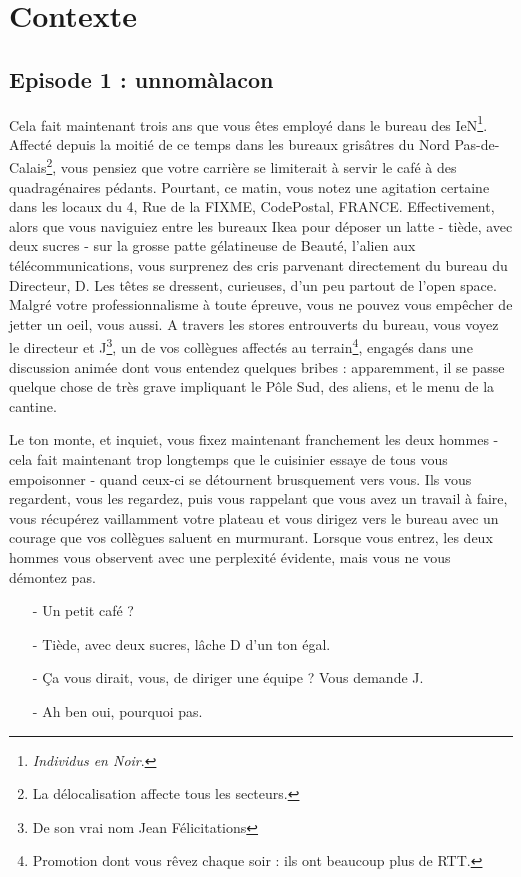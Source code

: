 \newpage

\section{Contexte}
\subsection{Episode 1 : unnomàlacon}

Cela fait maintenant trois ans que vous êtes employé dans le bureau des
IeN\footnote{\emph{Individus en Noir}\texttrademark.}.
Affecté depuis la moitié de ce temps dans les
bureaux grisâtres du Nord Pas-de-Calais\footnote{La délocalisation affecte tous
les secteurs.}, vous pensiez que votre carrière se limiterait à servir le café à des
quadragénaires pédants. 
Pourtant, ce matin, vous notez une agitation certaine dans les locaux du 4, Rue
de la FIXME, CodePostal, FRANCE. %
Effectivement, alors que vous naviguiez entre les bureaux Ikea pour déposer un
latte - tiède, avec deux sucres - sur la grosse patte gélatineuse de
Beauté, l'alien aux télécommunications, vous surprenez des cris parvenant directement du bureau du
Directeur, D. Les têtes se dressent, curieuses, d'un peu partout de
l'open space. Malgré votre professionnalisme à toute épreuve, vous ne pouvez
vous empêcher de jetter un oeil, vous aussi. A travers les stores entrouverts
du bureau, vous voyez le directeur et J\footnote{De son vrai nom Jean
Félicitations}, un de vos collègues affectés au terrain\footnote{Promotion dont vous
rêvez chaque soir : ils ont beaucoup plus de RTT.}, engagés dans une discussion animée dont vous entendez
quelques bribes : apparemment, il se passe quelque chose de très grave
impliquant le Pôle Sud, des aliens, et le menu de la cantine.

Le ton monte, et inquiet, vous fixez maintenant franchement les deux hommes -
cela fait maintenant trop longtemps que le cuisinier essaye de tous vous
empoisonner - quand ceux-ci se détournent brusquement vers vous. Ils vous
regardent, vous les regardez, puis vous rappelant que vous avez un travail à
faire, vous récupérez vaillamment votre plateau et vous dirigez vers le bureau
avec un courage que vos collègues saluent en murmurant. Lorsque vous entrez,
les deux hommes vous observent avec une perplexité évidente, mais vous ne vous démontez pas.

\begin{itemize}
\item[-] Un petit café ?
\item[-] Tiède, avec deux sucres, lâche D d'un ton égal.
\item[-] Ça vous dirait, vous, de diriger une équipe ? Vous demande J.
\item[-] Ah ben oui, pourquoi pas.
\end{itemize}

